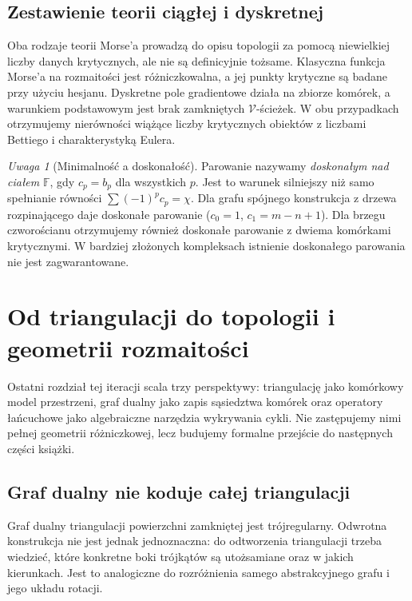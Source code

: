 \documentclass[11pt,a4paper]{report}
\numberwithin{equation}{section}
\theoremstyle{plain}
\theoremstyle{definition}
\theoremstyle{remark}
\newtheorem{uwaga}[twierdzenie]{Uwaga}
\begin{document}
\section{Zestawienie teorii ciągłej i dyskretnej}
\label{sec:tg-morse-bridge}

Oba rodzaje teorii Morse'a prowadzą do opisu topologii
za pomocą niewielkiej liczby danych krytycznych,
ale nie są definicyjnie tożsame. Klasyczna funkcja
Morse'a na rozmaitości jest różniczkowalna, a jej
punkty krytyczne są badane przy użyciu hesjanu.
Dyskretne pole gradientowe działa na zbiorze komórek,
a warunkiem podstawowym jest brak zamkniętych
$\mathcal V$-ścieżek. W obu przypadkach otrzymujemy
nierówności wiążące liczby krytycznych obiektów
z liczbami Bettiego i charakterystyką Eulera.

\begin{uwaga}[Minimalność a doskonałość]
Parowanie nazywamy \emph{doskonałym nad ciałem}
$\mathbb F$, gdy $c_p=b_p$ dla wszystkich $p$.
Jest to warunek silniejszy niż samo spełnianie równości
$\sum(-1)^pc_p=\chi$. Dla grafu spójnego konstrukcja
z drzewa rozpinającego daje doskonałe parowanie
($c_0=1$, $c_1=m-n+1$). Dla brzegu czworościanu
otrzymujemy również doskonałe parowanie z dwiema
komórkami krytycznymi. W bardziej złożonych
kompleksach istnienie doskonałego parowania nie jest
zagwarantowane.
\end{uwaga}

\chapter{Od triangulacji do topologii i geometrii rozmaitości}
\label{ch:tg-most-geometria}

Ostatni rozdział tej iteracji scala trzy perspektywy:
triangulację jako komórkowy model przestrzeni,
graf dualny jako zapis sąsiedztwa komórek oraz
operatory łańcuchowe jako algebraiczne narzędzia
wykrywania cykli. Nie zastępujemy nimi pełnej
geometrii różniczkowej, lecz budujemy formalne
przejście do następnych części książki.

\section{Graf dualny nie koduje całej triangulacji}
\label{sec:tg-limit-dual}

Graf dualny triangulacji powierzchni zamkniętej jest
trójregularny. Odwrotna konstrukcja nie jest jednak
jednoznaczna: do odtworzenia triangulacji trzeba wiedzieć,
które konkretne boki trójkątów są utożsamiane oraz
w jakich kierunkach. Jest to analogiczne do rozróżnienia
samego abstrakcyjnego grafu i jego układu rotacji.
\end{document}

